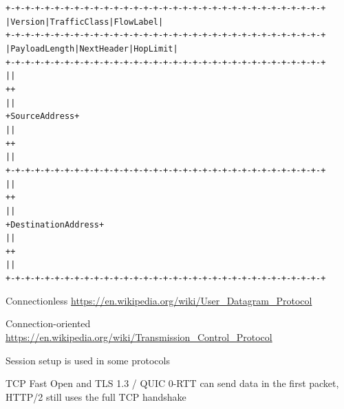 \documentclass[Screen16to9,17pt]{foils}
\begin{document}
\vskip -1cm
\begin{alltt}\footnotesize
   +-+-+-+-+-+-+-+-+-+-+-+-+-+-+-+-+-+-+-+-+-+-+-+-+-+-+-+-+-+-+-+-+
   |Version| Traffic Class |           Flow Label                  |
   +-+-+-+-+-+-+-+-+-+-+-+-+-+-+-+-+-+-+-+-+-+-+-+-+-+-+-+-+-+-+-+-+
   |         Payload Length        |  Next Header  |   Hop Limit   |
   +-+-+-+-+-+-+-+-+-+-+-+-+-+-+-+-+-+-+-+-+-+-+-+-+-+-+-+-+-+-+-+-+
   |                                                               |
   +                                                               +
   |                                                               |
   +                         Source Address                        +
   |                                                               |
   +                                                               +
   |                                                               |
   +-+-+-+-+-+-+-+-+-+-+-+-+-+-+-+-+-+-+-+-+-+-+-+-+-+-+-+-+-+-+-+-+
   |                                                               |
   +                                                               +
   |                                                               |
   +                      Destination Address                      +
   |                                                               |
   +                                                               +
   |                                                               |
   +-+-+-+-+-+-+-+-+-+-+-+-+-+-+-+-+-+-+-+-+-+-+-+-+-+-+-+-+-+-+-+-+
\end{alltt}

Connectionless \url{https://en.wikipedia.org/wiki/User_Datagram_Protocol}



Connection-oriented \url{https://en.wikipedia.org/wiki/Transmission_Control_Protocol}




\begin{list2}
\item Session setup is used in some protocols
\item TCP Fast Open and TLS 1.3 / QUIC 0-RTT can send data in the first packet, HTTP/2 still uses the full TCP handshake
\end{list2}
\end{document}
